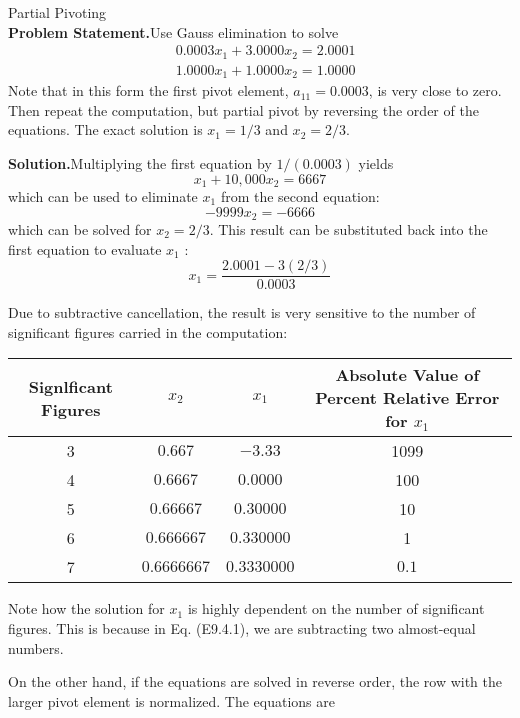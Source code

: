 \documentclass[../main.tex]{subfiles}
\begin{document}
\begin{example} Partial Pivoting\\

    \noindent\textbf{Problem Statement.}\quad Use Gauss elimination to solve\\

    $$
    \begin{aligned}
    &0.0003 x_{1}+3.0000 x_{2}=2.0001 \\
    &1.0000 x_{1}+1.0000 x_{2}=1.0000
    \end{aligned}
    $$
    Note that in this form the first pivot element, $a_{11}=0.0003$, is very close to zero. Then repeat the computation, but partial pivot by reversing the order of the equations. The exact solution is $x_{1}=1 / 3$ and $x_{2}=2 / 3$.

    \noindent\textbf{Solution.}\quad Multiplying the first equation by $1 /(0.0003)$ yields\\

    $$
    x_{1}+10,000 x_{2}=6667
    $$
    which can be used to eliminate $x_{1}$ from the second equation:
    $$
    -9999 x_{2}=-6666
    $$
    which can be solved for $x_{2}=2 / 3$. This result can be substituted back into the first equation to evaluate $x_{1}$ :
    $$
    x_{1}=\frac{2.0001-3(2 / 3)}{0.0003}
    $$

    Due to subtractive cancellation, the result is very sensitive to the number of significant figures carried in the computation:
    \bigskip

    \begin{tabular}{cccc}
    \hline Signlficant Figures & $x_{2}$ & $x_{1}$ & Absolute Value of Percent Relative Error for $x_{1}$ \\
    \hline 3 & $0.667$ & $-3.33$ & 1099 \\
    4 & $0.6667$ & $0.0000$ & 100 \\
    5 & $0.66667$ & $0.30000$ & 10 \\
    6 & $0.666667$ & $0.330000$ & 1 \\
    7 & $0.6666667$ & $0.3330000$ & $0.1$ \\
    \hline
    \end{tabular}
    \bigskip

    Note how the solution for $x_{1}$ is highly dependent on the number of significant figures. This is because in Eq. (E9.4.1), we are subtracting two almost-equal numbers.

    On the other hand, if the equations are solved in reverse order, the row with the larger pivot element is normalized. The equations are
    \bigskip


\end{example}
\end{document}
